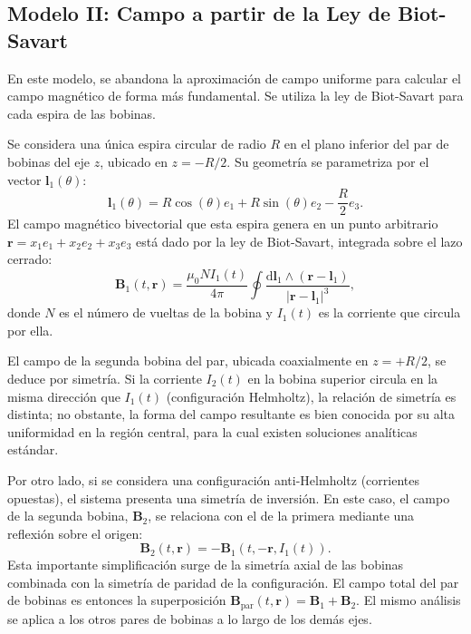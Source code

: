 \subsection{Modelo II: Campo a partir de la Ley de Biot-Savart}
\label{ssec:modelo_biot_savart}

En este modelo, se abandona la aproximación de campo uniforme para calcular
el campo magnético de forma más fundamental. Se utiliza la ley de
Biot-Savart para cada espira de las bobinas.

Se considera una única espira circular de radio $R$ en el plano inferior
del par de bobinas del eje $z$, ubicado en $z = -R/2$. Su geometría se
parametriza por el vector $\boldsymbol{l}_1(\theta)$:
%
\begin{equation}
	\boldsymbol{l}_1(\theta) = R \cos(\theta) e_1 + R \sin(\theta) e_2
	- \frac{R}{2} e_3.
\end{equation}
%
El campo magnético bivectorial que esta espira genera en un punto
arbitrario $\boldsymbol{r} = x_1 e_1 + x_2 e_2 + x_3 e_3$ está dado por la
ley de Biot-Savart, integrada sobre el lazo cerrado:
%
\begin{equation}
	\boldsymbol{B}_1(t, \boldsymbol{r}) = \frac{\mu_0 N I_1(t)}{4 \pi} \oint
	\frac{\mathrm{d}\boldsymbol{l}_1 \wedge (\boldsymbol{r} - \boldsymbol{l}_1)}
	{|\boldsymbol{r} - \boldsymbol{l}_1|^3},
	\label{eq:biot_savart_bivector}
\end{equation}
%
donde $N$ es el número de vueltas de la bobina y $I_1(t)$ es la corriente
que circula por ella.

El campo de la segunda bobina del par, ubicada coaxialmente en $z = +R/2$,
se deduce por simetría. Si la corriente $I_2(t)$ en la bobina superior
circula en la misma dirección que $I_1(t)$ (configuración Helmholtz),
la relación de simetría es distinta; no obstante, la forma del campo
resultante es bien conocida por su alta uniformidad en la región
central, para la cual existen soluciones analíticas estándar.

Por otro lado, si se considera una configuración anti-Helmholtz (corrientes
opuestas), el sistema presenta una simetría de inversión. En este caso, el
campo de la segunda bobina, $\boldsymbol{B}_2$, se relaciona con el de la
primera mediante una reflexión sobre el origen:
%
\begin{equation}
	\boldsymbol{B}_2(t, \boldsymbol{r}) =
	-\boldsymbol{B}_1(t, -\boldsymbol{r}, I_1(t)).
	\label{eq:simetria_inversion_B}
\end{equation}
%
Esta importante simplificación surge de la simetría axial de las bobinas
combinada con la simetría de paridad de la configuración. El campo total
del par de bobinas es entonces la superposición
$\boldsymbol{B}_{\text{par}}(t, \boldsymbol{r}) = \boldsymbol{B}_1 + \boldsymbol{B}_2$.
El mismo análisis se aplica a los otros pares de bobinas a lo largo de los
demás ejes.

